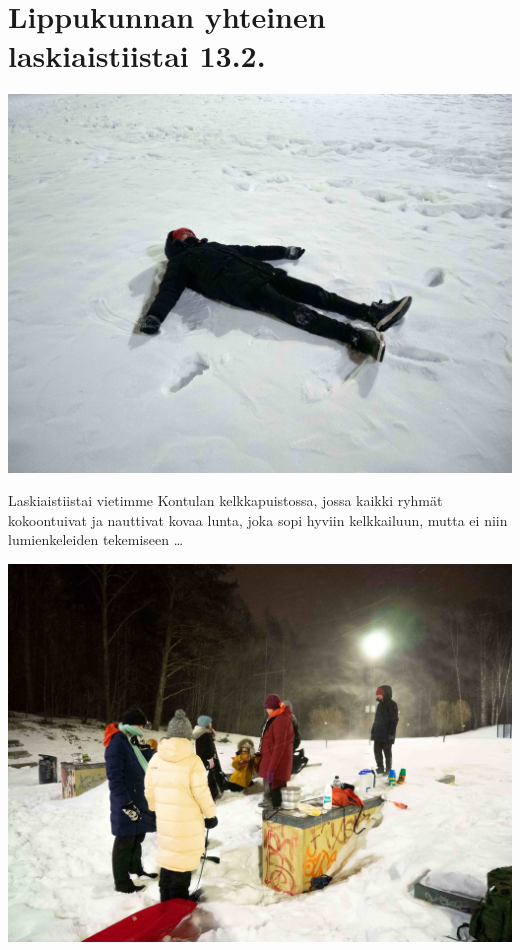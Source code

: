 
\section{Lippukunnan yhteinen laskiaistiistai 13.2.}

\begin{multicols}{2}

	\vspace*{0.16cm}
	\noindent\includegraphics[width=\linewidth]{assets/laskiaistiistai2}

	\small Laskiaistiistai vietimme Kontulan \mbox{kelkkapuistossa}, jossa kaikki
	ryhmät kokoontuivat ja nauttivat kovaa lunta, joka sopi hyviin kelkkailuun, mutta ei niin
	lumienkeleiden tekemiseen \ldots

	\vspace*{1.28cm}
	\noindent\includegraphics[width=\linewidth]{assets/laskiaistiistai1}


\end{multicols}
